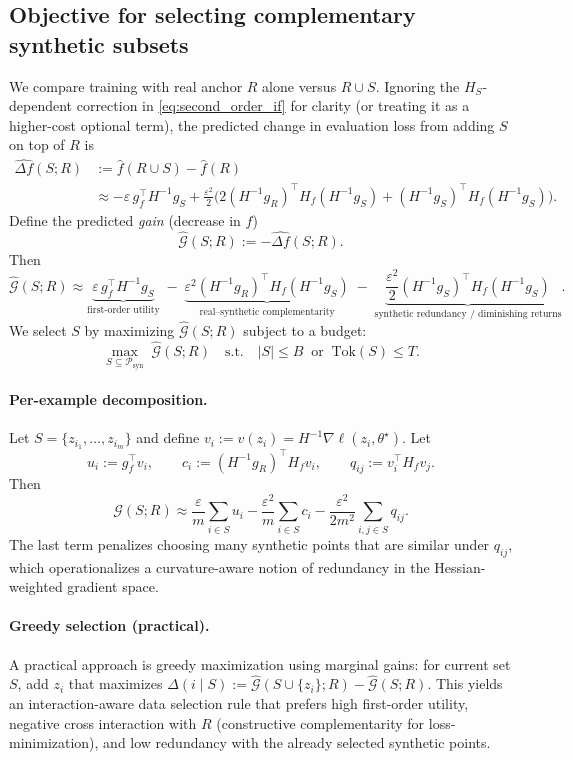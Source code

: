 \documentclass{article}
\theoremstyle{plain}
\theoremstyle{definition}
\theoremstyle{remark}
\begin{document}
\subsection{Objective for selecting complementary synthetic subsets}
We compare training with real anchor $R$ alone versus $R\cup S$.
Ignoring the $H_S$-dependent correction in \eqref{eq:second_order_if} for clarity (or treating it as a higher-cost optional term),
the predicted change in evaluation loss from adding $S$ on top of $R$ is
\begin{align}
\widehat{\Delta f}(S;R)
&:= \widehat{f}(R\cup S) - \widehat{f}(R) \nonumber\\
&\approx
-\varepsilon\, g_f^\top H^{-1} g_S
+\frac{\varepsilon^2}{2}\Big(
2(H^{-1}g_R)^\top H_f(H^{-1}g_S)
+
(H^{-1}g_S)^\top H_f(H^{-1}g_S)
\Big).
\label{eq:delta_f_RS}
\end{align}
Define the predicted \emph{gain} (decrease in $f$)
\[
\widehat{\mathcal{G}}(S;R) := -\widehat{\Delta f}(S;R).
\]
Then
\begin{equation}
\widehat{\mathcal{G}}(S;R)
\approx
\underbrace{\varepsilon\, g_f^\top H^{-1} g_S}_{\text{first-order utility}}
\;-\;
\underbrace{\varepsilon^2 (H^{-1}g_R)^\top H_f(H^{-1}g_S)}_{\text{real--synthetic complementarity}}
\;-\;
\underbrace{\frac{\varepsilon^2}{2}(H^{-1}g_S)^\top H_f(H^{-1}g_S)}_{\text{synthetic redundancy / diminishing returns}}.
\label{eq:gain_objective}
\end{equation}
We select $S$ by maximizing $\widehat{\mathcal{G}}(S;R)$ subject to a budget:
\[
\max_{S\subseteq \mathcal{P}_{\mathrm{syn}}} \;\widehat{\mathcal{G}}(S;R)
\quad
\text{s.t.}\quad |S|\le B \;\; \text{or}\;\; \mathrm{Tok}(S)\le T.
\]

\paragraph{Per-example decomposition.}
Let $S=\{z_{i_1},\dots,z_{i_m}\}$ and define $v_i := v(z_i)=H^{-1}\nabla \ell(z_i,\theta^\star)$.
Let
\[
u_i := g_f^\top v_i, \qquad c_i := (H^{-1}g_R)^\top H_f v_i, \qquad q_{ij} := v_i^\top H_f v_j.
\]
Then
\[
\widehat{\mathcal{G}}(S;R)
\approx
\frac{\varepsilon}{m}\sum_{i\in S} u_i
-\frac{\varepsilon^2}{m}\sum_{i\in S} c_i
-\frac{\varepsilon^2}{2m^2}\sum_{i,j\in S} q_{ij}.
\]
The last term penalizes choosing many synthetic points that are similar under $q_{ij}$,
which operationalizes a curvature-aware notion of redundancy in the Hessian-weighted gradient space.

\paragraph{Greedy selection (practical).}
A practical approach is greedy maximization using marginal gains:
for current set $S$, add $z_i$ that maximizes $\Delta(i\mid S) := \widehat{\mathcal{G}}(S\cup\{z_i\};R)-\widehat{\mathcal{G}}(S;R)$.
This yields an interaction-aware data selection rule that prefers
high first-order utility, negative cross interaction with $R$ (constructive complementarity for loss-minimization),
and low redundancy with the already selected synthetic points.
\end{document}
